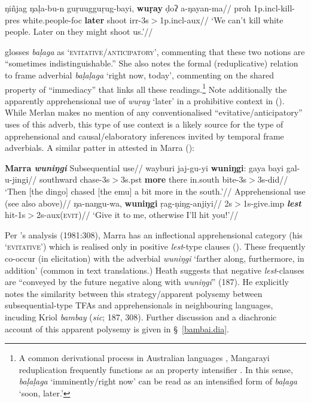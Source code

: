 \a\begingl\gla ŋiñjag ŋaḷa-bu-n guṛuugguṛug-bayi, \textbf{wuṛay} ḍoʔ a-ŋayan-ma//
\glb \gls{proh} 1p.\gls{incl}-kill-\gls{pres} white.people-\gls{foc} \textbf{later} shoot \gls{irr}-3s$\scriptscriptstyle>$1p.\gls{incl}-\gls{aux}//
\glft`We can't kill white people. Later on they might shoot us.'//\endgl
\xe



\citet[147]{Merlan1989} glosses \textit{baḷaga} as `\textsc{evitative/anticipatory}', commenting  that these two notions are ``sometimes indistinguishable.'' She also notes the formal (reduplicative) relation to frame adverbial \textit{baḷaḷaga} `right now, today', commenting on the shared property of ``immediacy'' that links all these readings.\footnote{A common derivational process in Australian languages \citetext{\citealp[113,209]{Dineen1990}; \citealp[201]{Dixon2002}}, Mangarayi reduplication frequently functions as an property intensifier \citep[166-7]{Merlan1989}. In this sense, \textit{baḷaḷaga} `imminently/right now' can be read as an intensified form of \textit{baḷaga} `soon, later.'} 
Note additionally the apparently apprehensional use of \textit{wuṛay} `later' in a prohibitive context in (). While Merlan makes no mention of any conventionalised ``evitative/anticipatory'' uses of this adverb, this type of use context is a likely source for the type of apprehensional and causal/elaboratory inferences invited by temporal frame adverbials. A similar patter in attested in Marra ():



\pex \textbf{Marra \textit{wuniŋgi}}
\a\begingl\glpreamble Subsequential use//
\gla wayburi jaj-gu-yi \textbf{wuniŋgi}: gaya bayi gal-u-jingi//
\glb southward chase-3s$\scriptscriptstyle>$3s.\gls{pst} \textbf{more} there in.south bite-3s$\scriptscriptstyle>$3s-did//
\glft`Then [the dingo] chased [the emu] a bit more in the south.'//\endgl
\a\begingl\glpreamble Apprehensional use (see also  above)//
\gla ŋa-naŋgu-wa, \textbf{wuniŋgi} ṛag-ṇiŋg-anjiyi//
\glb  2s$\scriptscriptstyle>$1s-give.\gls{imp} \textbf{\textsl{lest}} hit-1s$\scriptscriptstyle>$2s-\gls{aux}(\textsc{evit})//
\glft `Give it to me, otherwise I'll hit you!'//
\endgl
\xe

Per \citeauthor{Heath1981}'s analysis (1981:308), Marra has an inflectional apprehensional category (his `\textsc{evitative}') which is realised only in positive \textit{lest}-type clauses (). These frequently co-occur (in elicitation) with the adverbial \textit{wuniŋgi} `farther along, furthermore, in addition' (common in text translations.) Heath suggests that negative \textit{lest}-clauses are ``conveyed by the future negative along with \textit{wuniŋgi}'' (187). He explicitly notes the similarity between this strategy/apparent polysemy between subsequential-type TFAs and apprehensionals in neighbouring languages, incuding Kriol \textit{bambay} (\textit{sic}; 187, 308). Further discussion and a diachronic account of this apparent polysemy is given in \S~\ref{bambai.dia}.

